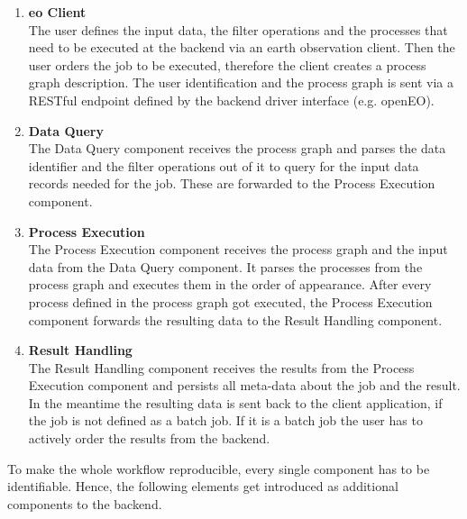 \documentclass[draft,final]{vutinfth} %
\begin{document}
 \begin{enumerate}
	\item \textbf{\gls{eo} Client} \\
	The user defines the input data, the filter operations and the processes that need to be executed at the backend via an earth observation client. Then the user orders the job to be executed, therefore the client creates a process graph description. The user identification and the process graph is sent via a RESTful endpoint defined by the backend driver interface (e.g. openEO).  
	\item \textbf{Data Query} \\ 
	The Data Query component receives the process graph and parses the data identifier and the filter operations out of it to query for the input data records needed for the job. These are forwarded to the Process Execution component.  
	\item \textbf{Process Execution} \\
	The Process Execution component receives the process graph and the input data from the Data Query component. It parses the processes from the process graph and executes them in the order of appearance. After every process defined in the process graph got executed, the Process Execution component forwards the resulting data to the Result Handling component.   
	\item \textbf{Result Handling} \\ 
	The Result Handling component receives the results from the Process Execution component and persists all meta-data about the job and the result. In the meantime the resulting data is sent back to the client application, if the job is not defined as a batch job. If it is a batch job the user has to actively order the results from the backend.  
\end{enumerate}

To make the whole workflow reproducible, every single component has to be identifiable. Hence, the following elements get introduced as additional components to the backend.
\end{document}
